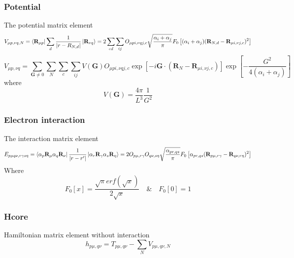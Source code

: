 \documentclass{article}
\begin{document}
        \subsubsection{Potential}
            The potential matrix element
            \begin{equation}
                V_{\mu p,\nu q,N} = \bra{\textbf{R}_{\mu p}}\sum_d\frac{1}{|r-R_{N,d}|}\ket{\textbf{R}_{\nu q}} 
                = 2 \sum_{cd}\sum_{ij}O_{\mu pi,\nu qj,c}\sqrt{\frac{\alpha_i+\alpha_j}{\pi}}
                F_0\left[(\alpha_i+\alpha_j)(\textbf{R}_{N,d}-\textbf{R}_{\mu i,\nu j,c})^2\right]
            \end{equation}
            \begin{equation}
                V_{\mu p,\nu q} = \sum_{\textbf{G}\neq 0}\sum_N\sum_c\sum_{ij}V(\textbf{G})O_{\mu pi,\nu qj,c}
                \exp\left[-i\textbf{G}\cdot(\textbf{R}_N-\textbf{R}_{\mu i,\nu j,c})\right]\exp\left[-\frac{G^2}{4(\alpha_i+\alpha_j)}\right]
            \end{equation}
            where
            \begin{equation}
                V(\textbf{G}) = \frac{4\pi}{L^3}\frac{1}{G^2}
            \end{equation}

        \subsubsection{Electron interaction}
            The interaction matrix element
            \begin{equation}
                E_{p\mu q\nu,r\gamma s\eta} = \bra{\alpha_p\textbf{R}_{\mu}\alpha_q\textbf{R}_{\nu}}
                \frac{1}{|r-r'|}\ket{\alpha_r\textbf{R}_{\gamma}\alpha_s\textbf{R}_{\eta}} 
                = 2 O_{p\mu,r\gamma}O_{q\nu,s\eta}\sqrt{\frac{\alpha_{pr,qs}}{\pi}}
                F_0\left[\alpha_{pr,qs}(\textbf{R}_{p\mu,r\gamma}-\textbf{R}_{q\nu,r\eta})^2\right]
            \end{equation}
            Where
            \begin{equation}
                F_0\left[x\right] = \frac{\sqrt{\pi}erf(\sqrt{x})}{2\sqrt{x}} \quad \& \quad F_0\left[0\right] = 1
            \end{equation}
            
        \subsubsection{Hcore}
            Hamiltonian matrix element without interaction
            \begin{equation}
                h_{p\mu,q\nu} = T_{p\mu,q\nu} - \sum_{N}V_{p\mu,q\nu,N}
            \end{equation}
\end{document}
